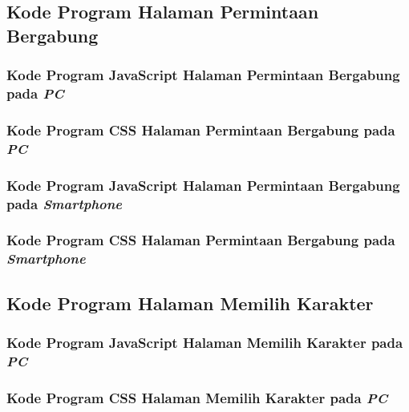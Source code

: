 \subsection{Kode Program Halaman Permintaan Bergabung}
\subsubsection{Kode Program JavaScript Halaman Permintaan Bergabung pada \textit{PC}}


\subsubsection{Kode Program CSS Halaman Permintaan Bergabung pada \textit{PC}}


\subsubsection{Kode Program JavaScript Halaman Permintaan Bergabung pada \textit{Smartphone}}


\subsubsection{Kode Program CSS Halaman Permintaan Bergabung pada \textit{Smartphone}}


\subsection{Kode Program Halaman Memilih Karakter}
\subsubsection{Kode Program JavaScript Halaman Memilih Karakter pada \textit{PC}}


\subsubsection{Kode Program CSS Halaman Memilih Karakter pada \textit{PC}}


